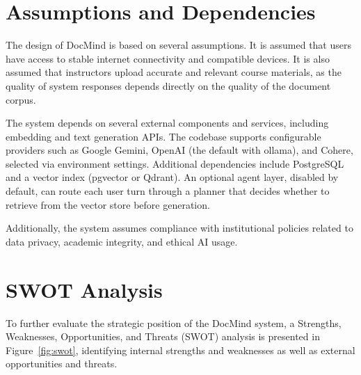 \documentclass[12pt, a4paper, oneside]{report}
\let\oldsection\section
\renewcommand{\section}{%
  \addtocontents{toc}{\protect\needspace{4\baselineskip}}%
  \oldsection
}
\begin{document}
\section{Assumptions and Dependencies}

The design of DocMind is based on several assumptions. It is assumed that users have access to stable internet connectivity and compatible devices. It is also assumed that instructors upload accurate and relevant course materials, as the quality of system responses depends directly on the quality of the document corpus.

The system depends on several external components and services, including embedding and text generation APIs. The codebase supports configurable providers such as Google Gemini, OpenAI (the default with ollama), and Cohere, selected via environment settings. Additional dependencies include PostgreSQL and a vector index (pgvector or Qdrant). An optional agent layer, disabled by default, can route each user turn through a planner that decides whether to retrieve from the vector store before generation.

Additionally, the system assumes compliance with institutional policies related to data privacy, academic integrity, and ethical AI usage.

\newpage

\section{SWOT Analysis}

To further evaluate the strategic position of the DocMind system, a Strengths, Weaknesses, Opportunities, and Threats (SWOT) analysis is presented in Figure~\ref{fig:swot}, identifying internal strengths and weaknesses as well as external opportunities and threats.


\newcommand{\swotcell}[4]{%
  \begin{minipage}[t][6.4cm][t]{7.1cm}
    \setlength{\parskip}{0pt}\singlespacing%
    \colorbox{#1}{\makebox[7.1cm][l]{\textbf{\textcolor{white}{\hspace{2pt}#3}}}}\\[4pt]
    \footnotesize
    \begin{itemize}[nosep,leftmargin=14pt,topsep=0pt,itemsep=4pt]
      #4
    \end{itemize}
  \end{minipage}%
}
\end{document}
